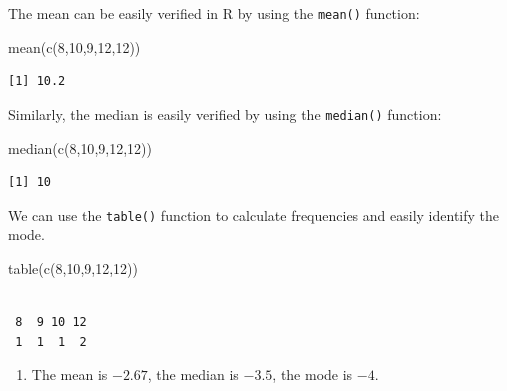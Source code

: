 \documentclass[
  letterpaper,
  DIV=11,
  numbers=noendperiod]{scrreprt}
\newenvironment{Shaded}{\begin{snugshade}}{\end{snugshade}}
\newcommand{\DecValTok}[1]{\textcolor[rgb]{0.68,0.00,0.00}{#1}}
\newcommand{\FunctionTok}[1]{\textcolor[rgb]{0.28,0.35,0.67}{#1}}
\newcommand{\NormalTok}[1]{\textcolor[rgb]{0.00,0.23,0.31}{#1}}
\providecommand{\tightlist}{%
  \setlength{\itemsep}{0pt}\setlength{\parskip}{0pt}}\usepackage{longtable,booktabs,array}
\begin{document}
The mean can be easily verified in R by using the \texttt{mean()}
function:

\begin{Shaded}
\begin{Highlighting}[numbers=left,,]
\FunctionTok{mean}\NormalTok{(}\FunctionTok{c}\NormalTok{(}\DecValTok{8}\NormalTok{,}\DecValTok{10}\NormalTok{,}\DecValTok{9}\NormalTok{,}\DecValTok{12}\NormalTok{,}\DecValTok{12}\NormalTok{))}
\end{Highlighting}
\end{Shaded}

\begin{verbatim}
[1] 10.2
\end{verbatim}

Similarly, the median is easily verified by using the \texttt{median()}
function:

\begin{Shaded}
\begin{Highlighting}[numbers=left,,]
\FunctionTok{median}\NormalTok{(}\FunctionTok{c}\NormalTok{(}\DecValTok{8}\NormalTok{,}\DecValTok{10}\NormalTok{,}\DecValTok{9}\NormalTok{,}\DecValTok{12}\NormalTok{,}\DecValTok{12}\NormalTok{))}
\end{Highlighting}
\end{Shaded}

\begin{verbatim}
[1] 10
\end{verbatim}

We can use the \texttt{table()} function to calculate frequencies and
easily identify the mode.

\begin{Shaded}
\begin{Highlighting}[numbers=left,,]
\FunctionTok{table}\NormalTok{(}\FunctionTok{c}\NormalTok{(}\DecValTok{8}\NormalTok{,}\DecValTok{10}\NormalTok{,}\DecValTok{9}\NormalTok{,}\DecValTok{12}\NormalTok{,}\DecValTok{12}\NormalTok{))}
\end{Highlighting}
\end{Shaded}

\begin{verbatim}

 8  9 10 12 
 1  1  1  2 
\end{verbatim}

\begin{enumerate}
\def\labelenumi{\arabic{enumi}.}
\setcounter{enumi}{1}
\tightlist
\item
  The mean is \(-2.67\), the median is \(-3.5\), the mode is \(-4\).
\end{enumerate}
\end{document}
